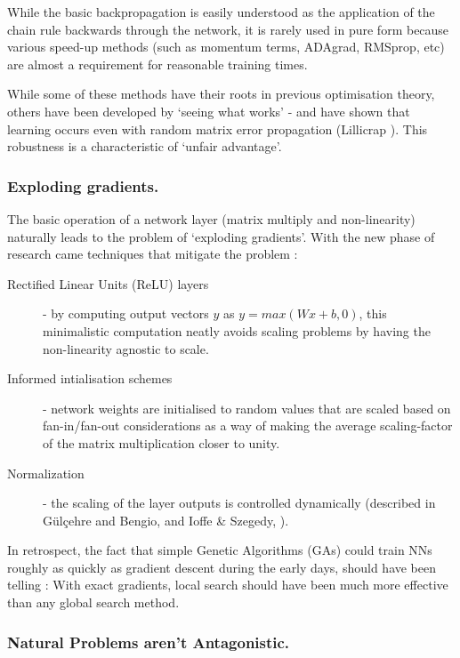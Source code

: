\documentclass[citeauthoryear]{llncs}
\begin{document}
While the basic backpropagation is easily understood as the application 
of the chain rule backwards through the network, it is rarely used in pure form
because various speed-up methods (such as momentum terms, ADAgrad, RMSprop, etc)
are almost a requirement for reasonable training times.  

While some of these methods have their roots in previous optimisation theory, 
others have been developed by `seeing what works' - and have shown that 
learning occurs even with random matrix error propagation 
(Lillicrap \cite{Lillicrap-random-matrix}).  
This robustness is a characteristic of `unfair advantage'.


\subsubsection*{Exploding gradients.}

The basic operation of a network layer (matrix multiply and non-linearity) 
naturally leads to the problem of `exploding gradients'.
With the new phase of research came techniques that mitigate the problem : 

\begin{description}

\item[Rectified Linear Units (ReLU) layers] - by computing output vectors $y$ 
as $y=max(Wx+b, 0)$, this minimalistic computation neatly avoids 
scaling problems by having the non-linearity agnostic to scale.

\item[Informed intialisation schemes] - network weights are initialised 
to random values that are scaled based on fan-in/fan-out considerations as a way of making the 
average scaling-factor of the matrix multiplication closer to unity.

\item[Normalization] - the scaling of the layer outputs is controlled
dynamically (described in G{\"u}l{\c{c}}ehre and Bengio, \cite{bengio-whitening} and 
Ioffe \& Szegedy, \cite{WhiteningOfData}).

\end{description}

In retrospect, the fact that simple Genetic Algorithms (GAs) could train 
NNs roughly as quickly as gradient descent during the early days, 
should have been telling : With exact gradients, local search should have 
been much more effective than any global search method.


\subsubsection*{Natural Problems aren't Antagonistic.}
\end{document}
